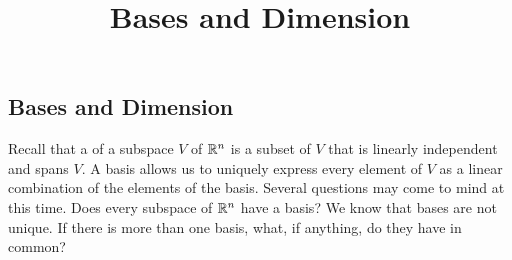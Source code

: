 \documentclass{ximera}
\title{Bases and Dimension} \license{CC BY-NC-SA 4.0}
\begin{document}
\begin{abstract}

\end{abstract}
\maketitle

\begin{onlineOnly}
\section*{Bases and Dimension}
\end{onlineOnly}

Recall that a  of a subspace $V$ of $\mathbb{R}^n$ is a subset of $V$ that is linearly independent and spans $V$.  A basis allows us to uniquely express every element of $V$ as a linear combination of the elements of the basis.  Several questions may come to mind at this time.  Does every subspace of $\mathbb{R}^n$ have a basis?  We know that bases are not unique.  If there is more than one basis, what, if anything, do they have in common?
\end{document}
